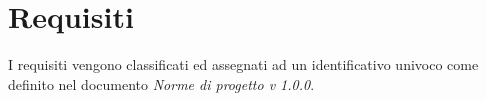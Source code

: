 
\section{Requisiti} 
I requisiti vengono classificati ed assegnati ad un identificativo  univoco come definito nel documento \textit{Norme di progetto v 1.0.0}.

